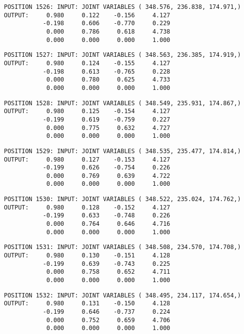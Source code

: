 \begin{verbatim}
POSITION 1526: INPUT: JOINT VARIABLES ( 348.576, 236.838, 174.971,)
OUTPUT:     0.980     0.122    -0.156     4.127
           -0.198     0.606    -0.770     0.229
            0.000     0.786     0.618     4.738
            0.000     0.000     0.000     1.000
\end{verbatim} \pagebreak[1]\begin{verbatim}
POSITION 1527: INPUT: JOINT VARIABLES ( 348.563, 236.385, 174.919,)
OUTPUT:     0.980     0.124    -0.155     4.127
           -0.198     0.613    -0.765     0.228
            0.000     0.780     0.625     4.733
            0.000     0.000     0.000     1.000
\end{verbatim} \pagebreak[1]\begin{verbatim}
POSITION 1528: INPUT: JOINT VARIABLES ( 348.549, 235.931, 174.867,)
OUTPUT:     0.980     0.125    -0.154     4.127
           -0.199     0.619    -0.759     0.227
            0.000     0.775     0.632     4.727
            0.000     0.000     0.000     1.000
\end{verbatim} \pagebreak[1]\begin{verbatim}
POSITION 1529: INPUT: JOINT VARIABLES ( 348.535, 235.477, 174.814,)
OUTPUT:     0.980     0.127    -0.153     4.127
           -0.199     0.626    -0.754     0.226
            0.000     0.769     0.639     4.722
            0.000     0.000     0.000     1.000
\end{verbatim} \pagebreak[1]\begin{verbatim}
POSITION 1530: INPUT: JOINT VARIABLES ( 348.522, 235.024, 174.762,)
OUTPUT:     0.980     0.128    -0.152     4.127
           -0.199     0.633    -0.748     0.226
            0.000     0.764     0.646     4.716
            0.000     0.000     0.000     1.000
\end{verbatim} \pagebreak[1]\begin{verbatim}
POSITION 1531: INPUT: JOINT VARIABLES ( 348.508, 234.570, 174.708,)
OUTPUT:     0.980     0.130    -0.151     4.128
           -0.199     0.639    -0.743     0.225
            0.000     0.758     0.652     4.711
            0.000     0.000     0.000     1.000
\end{verbatim} \pagebreak[1]\begin{verbatim}
POSITION 1532: INPUT: JOINT VARIABLES ( 348.495, 234.117, 174.654,)
OUTPUT:     0.980     0.131    -0.150     4.128
           -0.199     0.646    -0.737     0.224
            0.000     0.752     0.659     4.706
            0.000     0.000     0.000     1.000
\end{verbatim} \pagebreak[1]\begin{verbatim}

\end{verbatim}
